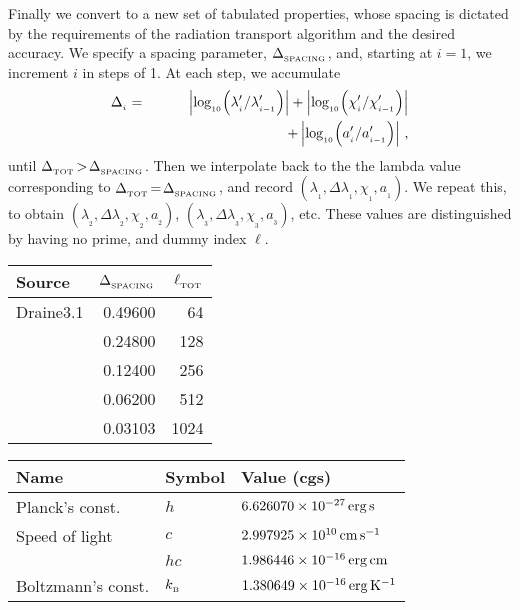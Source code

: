 \documentclass[usenatbib]{mn2e}
\numberwithin{equation}{section}
\begin{document}
Finally we convert to a new set of tabulated properties, whose spacing is dictated by the requirements of the radiation transport algorithm and the desired accuracy. We specify a spacing parameter, $\Delta_{_{\rm SPACING}}$, and, starting at $i\!=\!1$, we increment $i$ in steps of 1. At each step, we accumulate 
\begin{eqnarray}\nonumber
\Delta_{_i}&=&\left|\log_{_{10}}\!\left(\lambda'_{_i}/\lambda'_{_{i-1}}\right)\right|+\left|\log_{_{10}}\!\left(\chi'_{_i}/\chi'_{_{i-1}}\right)\right|\\
&&\hspace{3.3cm}+\left|\log_{_{10}}\!\left(a'_{_i}/a'_{_{i-1}}\right)\right|\,,
\end{eqnarray}
until $\Delta_{_{\rm TOT}}\!>\!\Delta_{_{\rm SPACING}}$. Then we interpolate back to the the lambda value corresponding to $\Delta_{_{\rm TOT}}\!=\!\Delta_{_{\rm SPACING}}$, and record $(\lambda_{_1},\Delta\lambda_{_1},\chi_{_1},a_{_1})$. We repeat this, to obtain $(\lambda_{_2},\Delta\lambda_{_2},\chi_{_2},a_{_2})$, $(\lambda_{_3},\Delta\lambda_{_3},\chi_{_3},a_{_3})$, etc. These values are distinguished by having no prime, and dummy index $\ell$.

\begin{table}
\begin{center}
\begin{tabular}{lrr}\hline
{\sc Source} & $\Delta_{_{\rm SPACING}}$ & $\ell_{_{\rm TOT}}$ \\\hline
Draine3.1 & 0.49600 & 64 \\
 & 0.24800 & 128 \\
 & 0.12400 & 256 \\
 & 0.06200 & 512 \\
 & 0.03103 & 1024 \\\hline
\end{tabular}
\end{center}
\end{table}

\begin{table}
\begin{center}
\begin{tabular}{lll}\hline
{\sc Name} & {\sc Symbol} & {\sc Value} (cgs) \\\hline
Planck's const. & $h$ & $6.626070\times 10^{-27}\,{\rm erg}\,{\rm s}$ \\
Speed of light & $c$ & $2.997925\times 10^{10}\,{\rm cm}\,{\rm s}^{-1}$ \\
 & $hc$ & $1.986446\times 10^{-16}\,{\rm erg}\,{\rm cm}$ \\
 Boltzmann's const. & $k_{_{\rm B}}$ & $1.380649\times 10^{-16}\,{\rm erg}\,{\rm K}^{-1}$ \\
\hline
\end{tabular}
\end{center}
\end{table}
\end{document}
